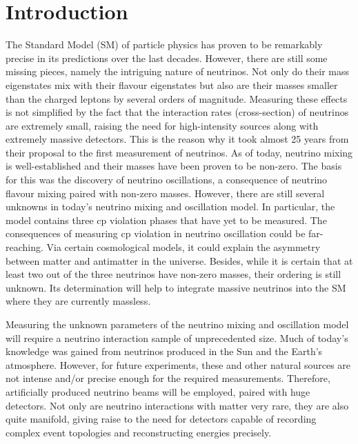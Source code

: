\chapter{Introduction}
\label{chap:introduction}

The Standard Model (SM) of particle physics has proven to be remarkably precise in its predictions over the last decades.
However, there are still some missing pieces, namely the intriguing nature of neutrinos.
Not only do their mass eigenstates mix with their flavour eigenstates but also are their masses smaller than the charged leptons by several orders of magnitude.
Measuring these effects is not simplified by the fact that the interaction rates (cross-section) of neutrinos are extremely small, raising the need for high-intensity sources along with extremely massive detectors.
This is the reason why it took almost \num{25} years from their proposal to the first measurement of neutrinos.
As of today, neutrino mixing is well-established and their masses have been proven to be non-zero.
The basis for this was the discovery of neutrino oscillations, a consequence of neutrino flavour mixing paired with non-zero masses.
However, there are still several unknowns in today's neutrino mixing and oscillation model.
In particular, the model contains three \gls{cp} violation phases that have yet to be measured.
The consequences of measuring \gls{cp} violation in neutrino oscillation could be far-reaching.
Via certain cosmological models, it could explain the asymmetry between matter and antimatter in the universe.
Besides, while it is certain that at least two out of the three neutrinos have non-zero masses, their ordering is still unknown.
Its determination will help to integrate massive neutrinos into the SM where they are currently massless.

Measuring the unknown parameters of the neutrino mixing and oscillation model will require a neutrino interaction sample of unprecedented size.
Much of today's knowledge was gained from neutrinos produced in the Sun and the Earth's atmosphere.
However, for future experiments, these and other natural sources are not intense and/or precise enough for the required measurements.
Therefore, artificially produced neutrino beams will be employed, paired with huge detectors.
Not only are neutrino interactions with matter very rare, they are also quite manifold, giving raise to the need for detectors capable of recording complex event topologies and reconstructing energies precisely.

